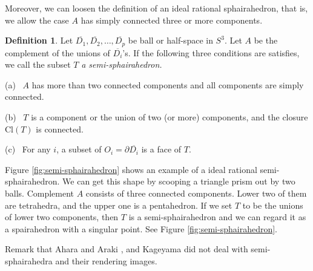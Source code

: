\documentclass[suppldata, dvipdfmx]{interact}
\theoremstyle{plain}%
\theoremstyle{definition}
\newtheorem{definition}[theorem]{Definition}
\theoremstyle{remark}
\theoremstyle{problemstyle}
\begin{document}

Moreover, we can loosen the definition of an ideal rational sphairahedron, 
that is, we allow the case $A$ has simply connected three or more components.

\begin{definition}
Let $\overline{D_1}, \overline{D_2},\ldots, \overline{D_p}$ be ball or
half-space in $S^3$.  Let $A$ be the complement of the unions of
$\overline{D_i}$'s.  If the following three conditions are satisfies, we call the subset $T$ {\it a semi-sphairahedron.}\par
(a) \ $A$ has more than two connected components and all
components are simply connected. \par 
(b) \ $T$ is a component or the union of two (or more) components, and the closure $\text{Cl}(T)$ is connected. \par
(c) \ For any $i$, a subset of $O_i=\partial \overline{D_i}$ is a face of $T$.
\end{definition}
Figure \ref{fig:semi-sphairahedron} shows an
example of a ideal rational semi-sphairahedron.  We can get this shape by scooping a
triangle prism out by two balls.  Complement $A$ consists of three
connected components. Lower two of them are tetrahedra, and the upper 
one is a pentahedron.  If we set $T$ to be the unions of lower two components,  
then $T$ is a semi-sphairahedron and we can regard it as a spairahedron with a singular point.  See Figure \ref{fig:semi-sphairahedron}.


Remark that Ahara and Araki \cite{AharaAraki},
and Kageyama \cite{kageyama} did not deal with semi-sphairahedra and their rendering images.
\end{document}
